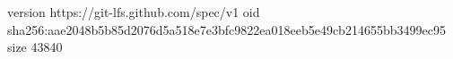 version https://git-lfs.github.com/spec/v1
oid sha256:aae2048b5b85d2076d5a518e7e3bfc9822ea018eeb5e49cb214655bb3499ec95
size 43840
